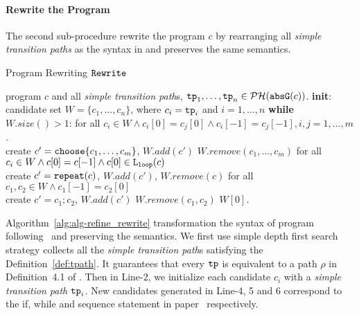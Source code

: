 
\paragraph{Rewrite the Program}
The second sub-procedure rewrite the program $c$ by rearranging all \emph{simple transition paths} as the syntax in \cite{GulwaniJK09} and preserves the same semantics.
{\small
\begin{algorithm}
\caption{Program Rewriting $\mathtt{Rewrite}$}
\label{alg:alg-refine_rewrite}
\begin{algorithmic}[1]
  \REQUIRE program $c$ and all \emph{simple transition path}s, $\mathtt{tp}_1, \ldots, \mathtt{tp}_n \in \mathcal{PH}(\mathtt{abs}{\mathtt{G}}(c))$.
  \STATE \textbf{init}: candidate set $W = \{c_1, \ldots, c_n\}$, where $c_i = \mathtt{tp}_i$ and $i = 1, \ldots, n$
  \STATE \textbf{while} $W.size()> 1$:
  \STATE \quad 
  for all $c_i \in W \land c_i[0] = c_j[0] \land c_i[-1] = c_j[-1], i, j = 1, \ldots, m$.
  \\ \quad create $c' = \rpchoose{c_1, \ldots, c_m}$, \qquad  $W.add(c')$ \qquad $W.remove(c_1, \ldots, c_m)$
  \STATE
  \quad for all $c_i \in W \land c[0] = c[-1] \land c[0] \in \mathtt{L}_{\mathtt{loop}}(c)$
  \\ \quad create $c' = \mathtt{repeat}(c)$, \qquad $W.add(c')$, \qquad $W.remove(c)$
  \STATE \quad for all $c_1, c_2 \in W \land c_1[-1] = c_2[0]$
  \\
  \quad create $c' = c_1; c_2$, \quad $W.add(c')$ \qquad $W.remove(c_1, c_2)$
  \RETURN $W[0]$.
\end{algorithmic}
\end{algorithm}
}%
Algorithm~\ref{alg:alg-refine_rewrite} transformation the syntax of program following~\cite{GulwaniJK09} and preserving the semantics.
We first use simple depth first search strategy collects all the \emph{simple transition path}s satisfying the Definition~\ref{def:tpath}. It guarantees that every $\mathtt{tp}$ is equivalent to a path $\rho$ in Definition~4.1 of \cite{GulwaniJK09}.
Then
in Line-2, we initialize each candidate $c_i$ with a \emph{simple transition path} $\mathtt{tp}_i$. New candidates generated in Line-4, 5 and 6 correspond to the if,
while and sequence statement in paper~\cite{GulwaniJK09} respectively.
